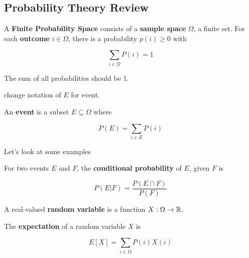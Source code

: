 \documentclass[12pt]{article}
\begin{document}
  \subsection{Probability Theory Review}

  \Definition {}
  {
    A {\bf Finite Probability Space} consists of a {\bf sample space} $\Omega$,
    a finite set. For each {\bf outcome} $i \in \Omega$, there is a probability
    $p(i) \ge 0$ with

    \[
      \sum_{i \in \Omega} P(i) = 1
    \]

    The sum of all probabilities should be 1.

    \TODO{} change notation of $E$ for event.

    An {\bf event} is a subset $E \subseteq \Omega$ where

    \[
      P(E) = \sum_{i \in E} P(i)
    \]
  }

  Let's look at some examples



  {
    For two events $E$ and $F$, the {\bf conditional probability} of $E$, given
    $F$ is

    \[
      P(E | F) = \frac{P(E \cap F)}{P(F)}
    \]
  }


  {
    A real-valued {\bf random variable} is a function $X: \Omega \to {\mathbb R}$.
  }


  {
    The {\bf expectation} of a random variable $X$ is

    \[
      E[X] = \sum_{i \in \Omega} P(i) X(i)
    \]
  }

\end{document}
